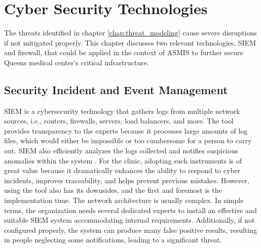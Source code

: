 \chapter{Cyber Security Technologies}
The threats identified in chapter \ref{chap:threat_modeling} cause severe disruptions if not mitigated properly. This chapter discusses two relevant technologies, SIEM and firewall, that could be applied in the context of ASMIS to further secure Queens medical center's critical infrastructure.

\section{Security Incident and Event Management}
SIEM is a cybersecurity technology that gathers logs from multiple network sources, i.e., routers, firewalls, servers, load balancers, and more. The tool provides transparency to the experts because it processes large amounts of log files, which would either be impossible or too cumbersome for a person to carry out. SIEM also efficiently analyzes the logs collected and notifies suspicious anomalies within the system \citep[p.~1]{SIEM}. For the clinic, adopting such instruments is of great value because it dramatically enhances the ability to respond to cyber incidents, improves traceability, and helps prevent previous mistakes. \newline\newline 
However, using the tool also has its downsides, and the first and foremost is the implementation time. The network architecture is usually complex. In simple terms, the organization needs several dedicated experts to install an effective and suitable SIEM system accommodating internal requirements. Additionally, if not configured properly, the system can produce many false positive results, resulting in people neglecting some notifications, leading to a significant threat.

